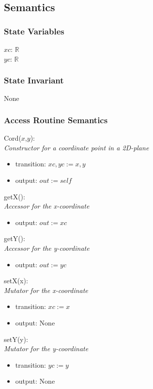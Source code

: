 \documentclass[12pt]{article}
\begin{document}
\subsection* {Semantics}

\subsubsection* {State Variables}

$xc$: $\mathbb{R}$\\
$yc$: $\mathbb{R}$

\subsubsection* {State Invariant}

None

\subsubsection* {Access Routine Semantics}

Cord($x$,$y$):\\
\textit{Constructor for a coordinate point in a 2D-plane}
\begin{itemize}
\item transition: $xc, yc := x, y$
\item output: $out := \mathit{self}$
\end{itemize}

\noindent
getX():\\
\textit{Accessor for the x-coordinate}
\begin{itemize}
\item output: $out := xc$
\end{itemize}

\noindent
getY():\\
\textit{Accessor for the y-coordinate}
\begin{itemize}
\item output: $out := yc$
\end{itemize}

\noindent
setX(x):\\
\textit{Mutator for the x-coordinate}
\begin{itemize}
\item transition: $xc := x$
\item output: None
\end{itemize}

\noindent
setY(y):\\
\textit{Mutator for the y-coordinate}
\begin{itemize}
\item transition: $yc := y$
\item output: None
\end{itemize}
\end{document}
